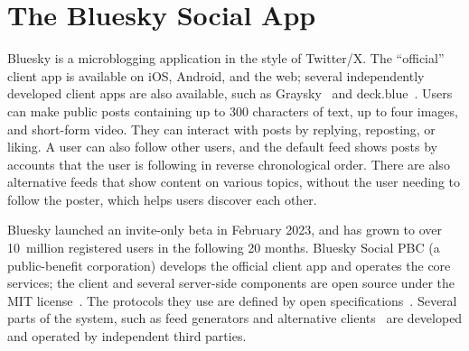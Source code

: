 \documentclass[sigconf]{acmart}
\begin{document}

\section{The Bluesky Social App}\label{sec:product}

Bluesky is a microblogging application in the style of Twitter/X. %
The ``official'' client app is available on iOS, Android, and the web; several independently developed client apps are also available, such as Graysky~\cite{Graysky} and deck.blue~\cite{deck.blue}.
Users can make public posts containing up to 300 characters of text, up to four images, and short-form video.
They can interact with posts by replying, reposting, or liking.
A user can also follow other users, and the default feed shows posts by accounts that the user is following in reverse chronological order.
There are also alternative feeds that show content on various topics, without the user needing to follow the poster, which helps users discover each other.


Bluesky launched an invite-only beta in February 2023, and has grown to over 10~million registered users in the following 20 months. %
Bluesky Social PBC (a public-benefit corporation) develops the official client app and operates the core services; the client and several server-side components are open source under the MIT license~\cite{BlueskyGithub}.
The protocols they use are defined by open specifications~\cite{AtProtoSpecs}.
Several parts of the system, such as feed generators and alternative clients~\cite{AtProtoClients} are developed and operated by independent third parties.
\end{document}
